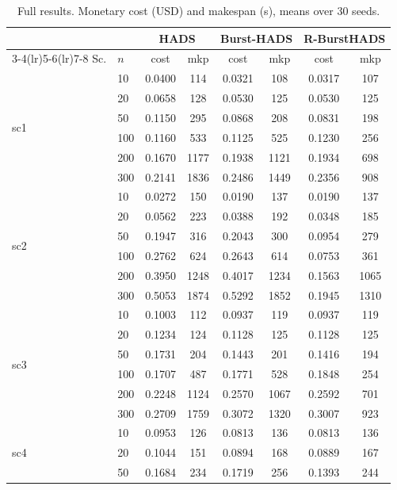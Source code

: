 \documentclass[conference]{IEEEtran}
\begin{document}
\begin{table}[t]
\caption{Full results. Monetary cost (USD) and makespan (s), means over 30 seeds.}
\label{tab:main}
\centering
\begin{tabular}{llcccccc}
\toprule
& & \multicolumn{2}{c}{HADS} & \multicolumn{2}{c}{Burst-HADS} & \multicolumn{2}{c}{R-BurstHADS} \\
\cmidrule(lr){3-4}\cmidrule(lr){5-6}\cmidrule(lr){7-8}
Sc. & $n$ & cost & mkp & cost & mkp & cost & mkp \\
\midrule
\multirow{6}{*}{sc1} & 10 & 0.0400 & 114 & 0.0321 & 108 & 0.0317 & 107 \\
 & 20 & 0.0658 & 128 & 0.0530 & 125 & 0.0530 & 125 \\
 & 50 & 0.1150 & 295 & 0.0868 & 208 & 0.0831 & 198 \\
 & 100 & 0.1160 & 533 & 0.1125 & 525 & 0.1230 & 256 \\
 & 200 & 0.1670 & 1177 & 0.1938 & 1121 & 0.1934 & 698 \\
 & 300 & 0.2141 & 1836 & 0.2486 & 1449 & 0.2356 & 908 \\
\midrule
\multirow{6}{*}{sc2} & 10 & 0.0272 & 150 & 0.0190 & 137 & 0.0190 & 137 \\
 & 20 & 0.0562 & 223 & 0.0388 & 192 & 0.0348 & 185 \\
 & 50 & 0.1947 & 316 & 0.2043 & 300 & 0.0954 & 279 \\
 & 100 & 0.2762 & 624 & 0.2643 & 614 & 0.0753 & 361 \\
 & 200 & 0.3950 & 1248 & 0.4017 & 1234 & 0.1563 & 1065 \\
 & 300 & 0.5053 & 1874 & 0.5292 & 1852 & 0.1945 & 1310 \\
\midrule
\multirow{6}{*}{sc3} & 10 & 0.1003 & 112 & 0.0937 & 119 & 0.0937 & 119 \\
 & 20 & 0.1234 & 124 & 0.1128 & 125 & 0.1128 & 125 \\
 & 50 & 0.1731 & 204 & 0.1443 & 201 & 0.1416 & 194 \\
 & 100 & 0.1707 & 487 & 0.1771 & 528 & 0.1848 & 254 \\
 & 200 & 0.2248 & 1124 & 0.2570 & 1067 & 0.2592 & 701 \\
 & 300 & 0.2709 & 1759 & 0.3072 & 1320 & 0.3007 & 923 \\
\midrule
\multirow{6}{*}{sc4} & 10 & 0.0953 & 126 & 0.0813 & 136 & 0.0813 & 136 \\
 & 20 & 0.1044 & 151 & 0.0894 & 168 & 0.0889 & 167 \\
 & 50 & 0.1684 & 234 & 0.1719 & 256 & 0.1393 & 244 \\

\end{tabular}
\end{table}
\end{document}
